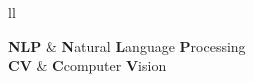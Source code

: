 \documentclass[
12pt, %
spanish, %
doublespacing, %
liststotoc, %
parskip, %
headsepline, %
]{MastersDoctoralThesis} %
\begin{document}
\begingroup\onehalfspacing
\tableofcontents %
\endgroup

\listoffigures %

\listoftables %


\begin{abbreviations}{ll} %

\textbf{NLP} & \textbf{N}atural \textbf{L}anguage \textbf{P}rocessing\\
\textbf{CV} & \textbf{C}computer \textbf{V}ision\\

\end{abbreviations}

%
%
%
%
%
%
%
%
%
%
\end{document}

